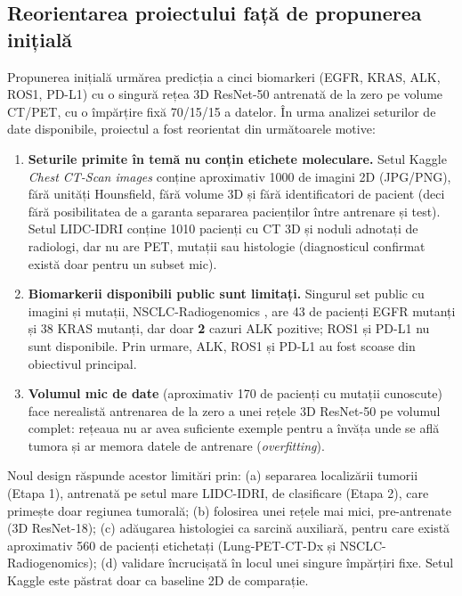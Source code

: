 \documentclass[11pt, a4paper]{article}
\begin{document}
\subsection{Reorientarea proiectului față de propunerea inițială}
\label{sec:reorientare}

Propunerea inițială urmărea predicția a cinci biomarkeri (EGFR, KRAS, ALK, ROS1, PD-L1) cu o singură rețea 3D ResNet-50 antrenată de la zero pe volume CT/PET, cu o împărțire fixă 70/15/15 a datelor. În urma analizei seturilor de date disponibile, proiectul a fost reorientat din următoarele motive:

\begin{enumerate}
    \item \textbf{Seturile primite în temă nu conțin etichete moleculare.} Setul Kaggle \textit{Chest CT-Scan images} conține aproximativ 1000 de imagini 2D (JPG/PNG), fără unități Hounsfield, fără volume 3D și fără identificatori de pacient (deci fără posibilitatea de a garanta separarea pacienților între antrenare și test). Setul LIDC-IDRI \cite{armato2011} conține 1010 pacienți cu CT 3D și noduli adnotați de radiologi, dar nu are PET, mutații sau histologie (diagnosticul confirmat există doar pentru un subset mic).
    \item \textbf{Biomarkerii disponibili public sunt limitați.} Singurul set public cu imagini și mutații, NSCLC-Radiogenomics \cite{bakr2018}, are 43 de pacienți EGFR mutanți și 38 KRAS mutanți, dar doar \textbf{2} cazuri ALK pozitive; ROS1 și PD-L1 nu sunt disponibile. Prin urmare, ALK, ROS1 și PD-L1 au fost scoase din obiectivul principal.
    \item \textbf{Volumul mic de date} (aproximativ 170 de pacienți cu mutații cunoscute) face nerealistă antrenarea de la zero a unei rețele 3D ResNet-50 pe volumul complet: rețeaua nu ar avea suficiente exemple pentru a învăța unde se află tumora și ar memora datele de antrenare (\textit{overfitting}).
\end{enumerate}

Noul design răspunde acestor limitări prin: (a) separarea localizării tumorii (Etapa 1), antrenată pe setul mare LIDC-IDRI, de clasificare (Etapa 2), care primește doar regiunea tumorală; (b) folosirea unei rețele mai mici, pre-antrenate (3D ResNet-18); (c) adăugarea histologiei ca sarcină auxiliară, pentru care există aproximativ 560 de pacienți etichetați (Lung-PET-CT-Dx \cite{li2020} și NSCLC-Radiogenomics); (d) validare încrucișată în locul unei singure împărțiri fixe. Setul Kaggle este păstrat doar ca baseline 2D de comparație.
\end{document}
